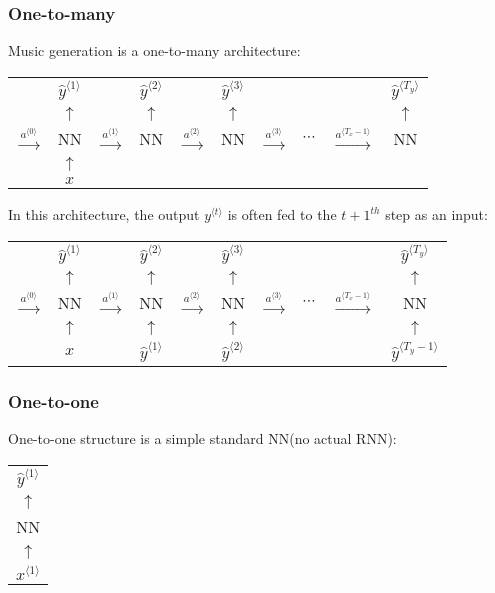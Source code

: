 \subsubsection{One-to-many}
Music generation is a one-to-many architecture:
\begin{center}
  \begin{tabular}{cccccccccc}
    & $\hat{y}^{\langle 1\rangle}$ & & $\hat{y}^{\langle 2\rangle}$ & & $\hat{y}^{\langle 3\rangle}$ & & & & $\hat{y}^{\langle T_y\rangle}$\\
    & $\uparrow$ & & $\uparrow$ & & $\uparrow$ & & & & $\uparrow$\\ 
    $\xrightarrow{a^{\langle 0\rangle}}$& NN & $\xrightarrow{a^{\langle 1\rangle}}$ & NN & $\xrightarrow{a^{\langle 2\rangle}}$ & NN & $\xrightarrow{a^{\langle 3\rangle}}$ & $\cdots$ & $\xrightarrow{a^{\langle T_x-1\rangle}}$ & NN \\ 
    & $\uparrow$ \\ 
    & $x$ \\
  \end{tabular}
\end{center}
In this architecture, the output $y^{\langle t\rangle}$ is often fed to the $t+1^{th}$ step as an input:
\begin{center}
  \begin{tabular}{cccccccccc}
    & $\hat{y}^{\langle 1\rangle}$ & & $\hat{y}^{\langle 2\rangle}$ & & $\hat{y}^{\langle 3\rangle}$ & & & & $\hat{y}^{\langle T_y\rangle}$\\
    & $\uparrow$ & & $\uparrow$ & & $\uparrow$ & & & & $\uparrow$\\ 
    $\xrightarrow{a^{\langle 0\rangle}}$& NN & $\xrightarrow{a^{\langle 1\rangle}}$ & NN & $\xrightarrow{a^{\langle 2\rangle}}$ & NN & $\xrightarrow{a^{\langle 3\rangle}}$ & $\cdots$ & $\xrightarrow{a^{\langle T_x-1\rangle}}$ & NN \\ 
    & $\uparrow$ & & $\uparrow$ & & $\uparrow$ & & & & $\uparrow$\\ 
    & $x$ & & \color{red}$\hat{y}^{\langle 1\rangle}$ & & \color{red}$\hat{y}^{\langle 2\rangle}$ & & & & \color{red}$\hat{y}^{\langle T_y-1\rangle}$\\
  \end{tabular}
\end{center}
\subsubsection{One-to-one}
One-to-one structure is a simple standard NN(no actual RNN):
\begin{center}
  \begin{tabular}{c}
    $\hat{y}^{\langle 1\rangle}$\\
    $\uparrow$\\ 
    NN\\
    $\uparrow$\\ 
    $x^{\langle 1\rangle}$ 
  \end{tabular}
\end{center}
